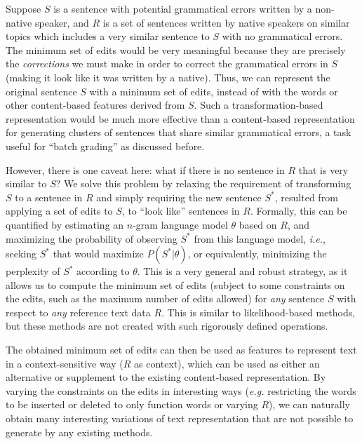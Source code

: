 Suppose $S$ is a sentence with potential grammatical errors written by a
non-native speaker, and $R$ is a set of sentences written by native speakers on
similar topics which includes a very similar sentence to $S$ with no grammatical
errors. The minimum set of edits would be very meaningful because they are
precisely the {\em corrections} we must make in order to correct the grammatical
errors in $S$ (making it look like it was written by a native). Thus, we can
represent the original sentence $S$ with a minimum set of edits, instead of with
the words or other content-based features derived from $S$. Such a
transformation-based representation would be much more effective than a
content-based representation for generating clusters of sentences that share
similar grammatical errors, a task useful for ``batch grading'' as discussed
before.

However, there is one caveat here: what if there is no sentence in $R$ that is
very similar to $S$? We solve this problem by relaxing the requirement of
transforming $S$ to a sentence in $R$ and simply requiring the new sentence
$S^*$, resulted from applying a set of edits to $S$, to ``look like'' sentences
in $R$. Formally, this can be quantified by estimating an $n$-gram language
model $\theta$ based on $R$, and maximizing the probability of observing $S^*$
from this language model, \emph{i.e.}, seeking $S^*$ that would maximize
$P(S^*|\theta)$, or equivalently, minimizing the perplexity of $S^*$ according
to $\theta$. This is a very general and robust strategy, as it allows us to
compute the minimum set of edits (subject to some constraints on the edits, such
as the maximum number of edits allowed) for {\em any} sentence $S$ with respect
to {\em any} reference text data $R$. This is similar to likelihood-based
methods, but these methods are not created with such rigorously defined
operations.

The obtained minimum set of edits can then be used as features to represent text
in a context-sensitive way ($R$ as context), which can be used as either an
alternative or supplement to the existing content-based representation. By
varying the constraints on the edits in interesting ways (\emph{e.g.}
restricting the words to be inserted or deleted to only function words or
varying $R$), we can naturally obtain many interesting variations of text
representation that are not possible to generate by any existing methods.


